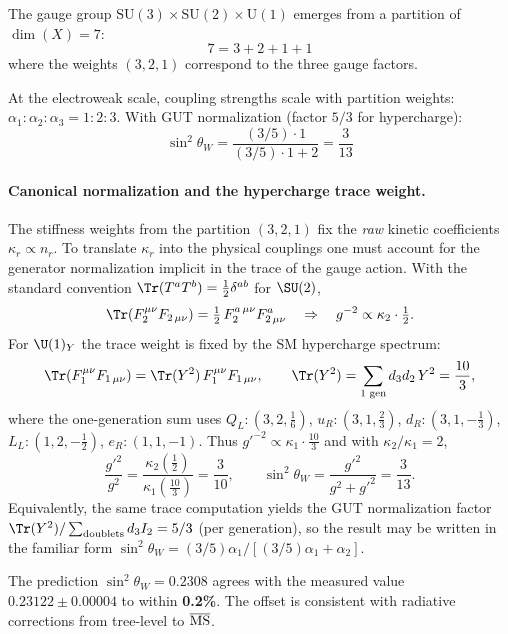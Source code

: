 \documentclass[aps,prl,twocolumn,superscriptaddress]{revtex4-2}
\begin{document}
The gauge group $\mathrm{SU}(3) \times \mathrm{SU}(2) \times \mathrm{U}(1)$
emerges from a partition of $\dim(X) = 7$:
\begin{equation}
7 = 3 + 2 + 1 + 1
\end{equation}
where the weights $(3,2,1)$ correspond to the three gauge factors.

At the electroweak scale, coupling strengths scale with partition weights:
$\alpha_1 : \alpha_2 : \alpha_3 = 1 : 2 : 3$. With GUT normalization
(factor $5/3$ for hypercharge):
\begin{equation}
\sin^2\theta_W = \frac{(3/5) \cdot 1}{(3/5) \cdot 1 + 2} = \frac{3}{13}
\end{equation}

\paragraph{Canonical normalization and the hypercharge trace weight.}
The stiffness weights from the partition $(3,2,1)$ fix the \emph{raw} kinetic
coefficients $\kappa_r\propto n_r$.
To translate $\kappa_r$ into the physical couplings one must account for the
generator normalization implicit in the trace of the gauge action.
With the standard convention $\Tr(T^aT^b)=\tfrac12\delta^{ab}$ for $\SU(2)$,
\[
\Tr(F_2^{\mu\nu}F_{2\,\mu\nu})=\tfrac12\,F_2^{a\,\mu\nu}F^a_{2\,\mu\nu}
\quad\Rightarrow\quad
g^{-2}\propto \kappa_2\cdot\tfrac12 .
\]
For $\U(1)_Y$ the trace weight is fixed by the SM hypercharge spectrum:
\[
\Tr(F_1^{\mu\nu}F_{1\,\mu\nu})=\Tr(Y^2)\,F_1^{\mu\nu}F_{1\,\mu\nu},
\qquad
\Tr(Y^2)=\sum_{\text{1 gen}} d_3 d_2\,Y^2=\frac{10}{3},
\]
where the one-generation sum uses
$Q_L:(3,2,\tfrac16)$, $u_R:(3,1,\tfrac23)$, $d_R:(3,1,-\tfrac13)$,
$L_L:(1,2,-\tfrac12)$, $e_R:(1,1,-1)$.
Thus $g'^{-2}\propto \kappa_1\cdot\tfrac{10}{3}$ and with $\kappa_2/\kappa_1=2$,
\[
\frac{g'^2}{g^2}=\frac{\kappa_2(\tfrac12)}{\kappa_1(\tfrac{10}{3})}=\frac{3}{10},
\qquad
\sin^2\theta_W=\frac{g'^2}{g^2+g'^2}=\frac{3}{13}.
\]
Equivalently, the same trace computation yields the GUT normalization factor
$\Tr(Y^2)/\sum_{\rm doublets} d_3 I_2 = 5/3$ (per generation), so the result
may be written in the familiar form $\sin^2\theta_W=(3/5)\alpha_1/[(3/5)\alpha_1+\alpha_2]$.


The prediction $\sin^2\theta_W = 0.2308$ agrees with the measured value
$0.23122 \pm 0.00004$ to within \textbf{0.2\%}. The offset is consistent
with radiative corrections from tree-level to $\overline{\rm MS}$.
\end{document}
